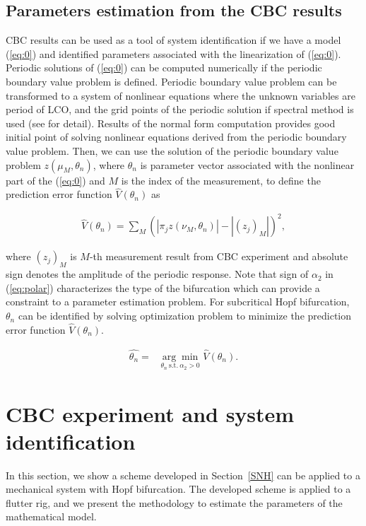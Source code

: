 \documentclass[openacc]{rsproca_new}%
\newcommand{\Eref}[1]{(\ref{#1})}
\newcommand{\Sref}[1]{Section~\ref{#1}}
\begin{document}
\subsection{Parameters estimation from the CBC results}\label{NSI}
CBC results can be used as a tool of system identification if we have a model \Eref{eq:0} and identified parameters associated with the linearization of \Eref{eq:0}. Periodic solutions of \Eref{eq:0} can be computed numerically if the periodic boundary value problem is defined. Periodic boundary value problem can be transformed to a system of nonlinear equations where the unknown variables are period of LCO, and the grid points of the periodic solution if spectral method is used (see \cite{trefethen2000spectral} for detail). Results of the normal form computation provides good initial point of solving nonlinear equations derived from the periodic boundary value problem. Then, we can use the solution of the periodic boundary value problem $z(\mu_M,\theta_n)$, where $\theta_n$ is parameter vector associated with the nonlinear part of the \Eref{eq:0} and $M$ is the index of the measurement, to define the prediction error function $\hat{V}(\theta_n)$ as

\begin{align}\label{NSI-2}
\hat{V}(\theta_n)= \sum_M (|\pi_j z(\nu_M,\theta_n)|-|(z_j)_M|)^2,
\end{align}

\noindent where $(z_j)_M$ is $M$-th measurement result from CBC experiment and absolute sign denotes the amplitude of the periodic response. Note that sign of $\alpha_2$ in \Eref{eq:polar} characterizes the type of the bifurcation which can provide a constraint to a parameter estimation problem. For subcritical Hopf bifurcation, $\theta_n$ can be identified by solving optimization problem to minimize the prediction error function $\hat{V}(\theta_n)$.

\begin{align}\label{NSI-3}
\hat{\theta_n}=&\underset{\theta_n \: \textrm{s.t.} \: \alpha_2>0} {\arg\min} \: \hat V(\theta_n).
\end{align}

\section{CBC experiment and system identification}
In this section, we show a scheme developed in \Sref{SNH} can be applied to a mechanical system with Hopf bifurcation. The developed scheme is applied to a flutter rig, and we present the methodology to estimate the parameters of the mathematical model.
\end{document}
